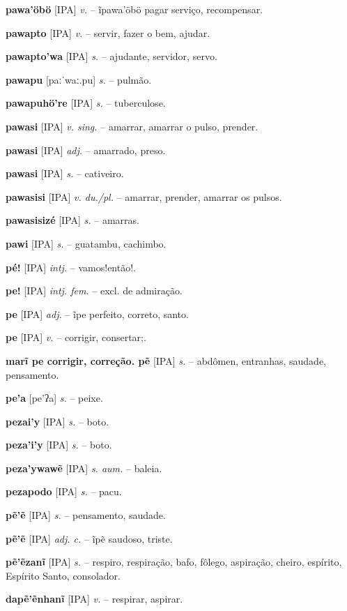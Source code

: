 \textbf{pawa'öbö} [IPA] \textit{v.} -- ĩpawa'öbö pagar serviço, recompensar.

\textbf{pawapto} [IPA] \textit{v.} -- servir, fazer o bem, ajudar.

\textbf{pawapto'wa} [IPA] \textit{s.} -- ajudante, servidor, servo.

\textbf{pawapu} [paːˈwaː.pu] \textit{s.} -- pulmão.

\textbf{pawapuhö're} [IPA] \textit{s.} -- tuberculose.

\textbf{pawasi} [IPA] \textit{v. sing.} -- amarrar, amarrar o pulso, prender.

\textbf{pawasi} [IPA] \textit{adj.} -- amarrado, preso.

\textbf{pawasi} [IPA] \textit{s.} -- cativeiro.

\textbf{pawasisi} [IPA] \textit{v. du./pl.} -- amarrar, prender, amarrar os pulsos.

\textbf{pawasisizé} [IPA] \textit{s.} -- amarras.

\textbf{pawi} [IPA] \textit{s.} -- guatambu, cachimbo.

\textbf{pé!} [IPA] \textit{intj.} -- vamos!então!.

\textbf{pe!} [IPA] \textit{intj. fem.} -- excl. de admiração.

\textbf{pe} [IPA] \textit{adj.} -- ĩpe perfeito, correto, santo.

\textbf{pe} [IPA] \textit{v.} -- corrigir, consertar;.

\textbf{marĩ pe corrigir, correção. pẽ} [IPA] \textit{s.} -- abdômen, entranhas, saudade, pensamento.

\textbf{pe'a} [pe'ʔa] \textit{s.} -- peixe.

\textbf{pezai'y} [IPA] \textit{s.} -- boto.

\textbf{peza'i'y} [IPA] \textit{s.} -- boto.

\textbf{peza'ywawẽ} [IPA] \textit{s. aum.} -- baleia.

\textbf{pezapodo} [IPA] \textit{s.} -- pacu.

\textbf{pẽ'ẽ} [IPA] \textit{s.} -- pensamento, saudade.

\textbf{pẽ'ẽ} [IPA] \textit{adj. c.} -- ĩpẽ saudoso, triste.

\textbf{pẽ'ẽzanĩ} [IPA] \textit{s.} -- respiro, respiração, bafo, fôlego, aspiração, cheiro, espírito, Espírito Santo, consolador.

\textbf{dapẽ'ẽnhanĩ} [IPA] \textit{v.} -- respirar, aspirar. \href{https://xavante.pythonanywhere.com/static/dicionario/play.html?file=breathe.wav}{\faHeadphones}

